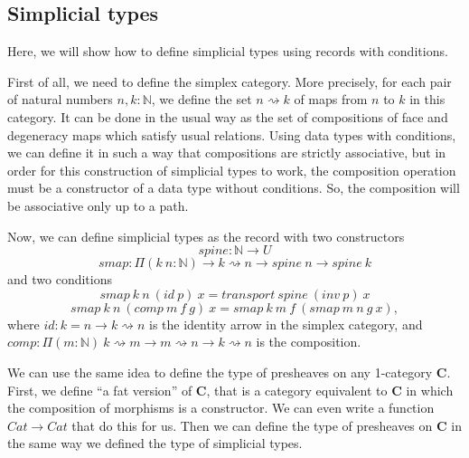 \documentclass{amsart}
\theoremstyle{definition}
\theoremstyle{remark}
\newcommand{\cat}[1]{\mathbf{#1}}
\newcommand{\C}{\cat{C}}
\numberwithin{figure}{section}
\begin{document}
\subsection{Simplicial types}

Here, we will show how to define simplicial types using records with conditions.

First of all, we need to define the simplex category.
More precisely, for each pair of natural numbers $n,k : \mathbb{N}$, we define the set $n \rightsquigarrow k$ of maps from $n$ to $k$ in this category.
It can be done in the usual way as the set of compositions of face and degeneracy maps which satisfy usual relations.
Using data types with conditions, we can define it in such a way that compositions are strictly associative, but
in order for this construction of simplicial types to work, the composition operation must be a constructor of a data type without conditions.
So, the composition will be associative only up to a path.

Now, we can define simplicial types as the record with two constructors
\[ spine : \mathbb{N} \to U \]
\[ smap : \Pi (k\ n : \mathbb{N}) \to k \rightsquigarrow n \to spine\ n \to spine\ k \]
and two conditions
\[ smap\ k\ n\ (id\ p)\ x = transport\ spine\ (inv\ p)\ x \]
\[ smap\ k\ n\ (comp\ m\ f\ g)\ x = smap\ k\ m\ f\ (smap\ m\ n\ g\ x), \]
where $id : k = n \to k \rightsquigarrow n$ is the identity arrow in the simplex category,
and $comp : \Pi (m : \mathbb{N})\ k \rightsquigarrow m \to m \rightsquigarrow n \to k \rightsquigarrow n$ is the composition.

We can use the same idea to define the type of presheaves on any 1-category $\C$.
First, we define ``a fat version''  of $\C$, that is a category equivalent to $\C$ in which the composition of morphisms is a constructor.
We can even write a function $Cat \to Cat$ that do this for us.
Then we can define the type of presheaves on $\C$ in the same way we defined the type of simplicial types.

% 
% 
\end{document}
